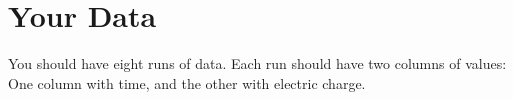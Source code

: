 \section{Your Data}
%
You should have eight runs of data. Each run should have two columns of values: One column with time, and the other with electric charge.
%
%
\newpage
